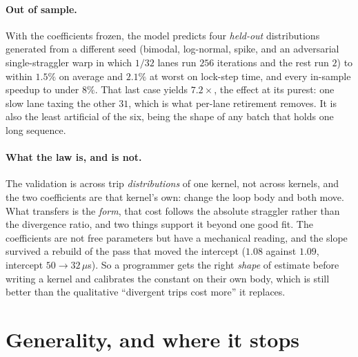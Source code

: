 \documentclass[sigplan,screen,review,anonymous]{acmart}
\begin{document}
\paragraph{Out of sample.} With the coefficients frozen, the model predicts four
\emph{held-out} distributions generated from a different seed (bimodal, log-normal, spike,
and an adversarial single-straggler warp in which $1/32$ lanes run $256$ iterations and the rest
run $2$) to within $1.5\%$ on average and $2.1\%$ at worst on lock-step time, and every
in-sample speedup to under $8\%$. That last case yields $7.2\times$, the effect at its purest:
one slow lane taxing the other $31$, which is what per-lane retirement removes. It is also
the least artificial of the six, being the shape of any batch that holds one long
sequence.

\paragraph{What the law is, and is not.} The validation is across trip
\emph{distributions} of one kernel, not across kernels, and the two coefficients are that
kernel's own: change the loop body and both move. What transfers is the \emph{form}, that
cost follows the absolute straggler rather than the divergence ratio, and two things
support it beyond one good fit. The coefficients are not free parameters but have a
mechanical reading, and the slope survived a rebuild of the pass that moved the intercept
($1.08$ against $1.09$, intercept $50\rightarrow32\,\mu$s). So a programmer gets the right
\emph{shape} of estimate before writing a kernel and calibrates the constant on their own
body, which is still better than the qualitative ``divergent trips cost more'' it
replaces.

\section{Generality, and where it stops}\label{sec:general}
\end{document}
